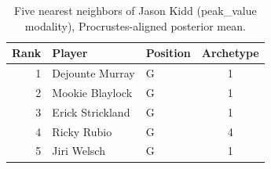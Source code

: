 \begin{table}[htbp]
  \centering\small
  \begin{tabular}{rllc}
    \toprule
    Rank & Player & Position & Archetype \\
    \midrule
    1 & Dejounte Murray & G & 1 \\
    2 & Mookie Blaylock & G & 1 \\
    3 & Erick Strickland & G & 1 \\
    4 & Ricky Rubio & G & 4 \\
    5 & Jiri Welsch & G & 1 \\
    \bottomrule
  \end{tabular}
  \caption{Five nearest neighbors of Jason Kidd (peak_value modality), Procrustes-aligned posterior mean.}
  \label{tab:Jason_Kidd_neighbors_peak_value}
\end{table}

